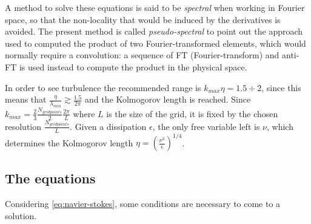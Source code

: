 A method to solve these equations is said to be \textit{spectral} when working in Fourier space, so that the non-locality that would be induced by the derivatives is avoided. The present method is called \textit{pseudo-spectral} to point out the approach used to computed the product of two Fourier-transformed elements, which would normally require a convolution: a sequence of FT (Fourier-transform) and anti-FT is used instead to compute the product in the physical space.

In order to see turbulence the recommended range is \( k_{max}\eta= 1.5\div2 \), since this means that \( \frac{\eta}{\lambda_{min}} \gtrsim \frac{1.5}{2\pi} \) and the Kolmogorov length is reached. Since \( k_{max} = \frac{2}{3} \frac{N_{grid points}}{2} \frac{2\pi}{L} \) where $L$ is the size of the grid, it is fixed by the chosen resolution $\frac{N_{grid points}}{L}$. Given a dissipation $\epsilon$, the only free variable left is $\nu$, which determines the Kolmogorov length \(\eta=\left(\frac{\nu^3}{\epsilon}\right)^{1/4}\).

\subsection{The equations}
Considering \autoref{eq:navier-stokes}, some conditions are necessary to come to a solution. 
